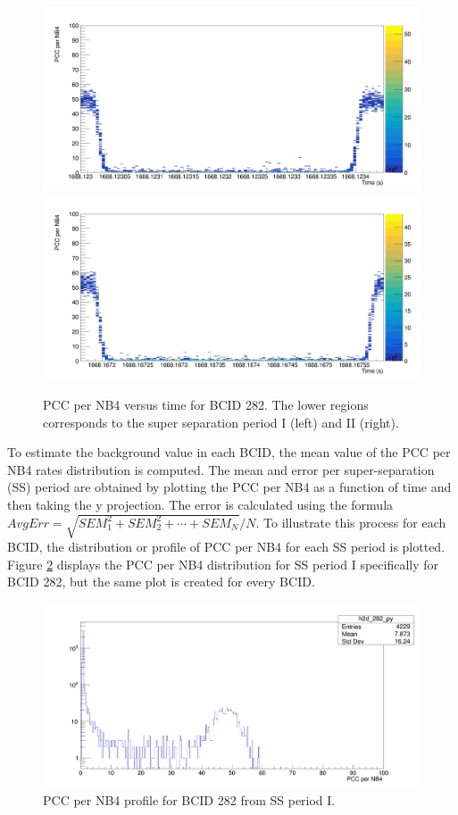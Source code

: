 \begin{center}
\begin{figure}[h!]
\centering
\includegraphics[width=.49\textwidth]{Chapter4/BX_282_Rates_SS1.png}
\includegraphics[width=.49\textwidth]{Chapter4/BX_282_Rates_SS2.png}
\caption[Super Separation periods for BCID 282]{PCC per NB4 versus time for BCID 282. The lower regions corresponds to the super separation period I (left) and II (right).}
\label{ssp_wide_bx282}
\end{figure}
\end{center}

To estimate the background value in each BCID, the mean value of the PCC per NB4 rates distribution is computed. The mean and error per super-separation (SS) period are obtained by plotting the PCC per NB4 as a function of time and then taking the y projection. The error is calculated using the formula $AvgErr = \sqrt{SEM_1^2 + SEM_2^2 + \cdots + SEM_N}/N$. To illustrate this process for each BCID, the distribution or profile of PCC per NB4 for each SS period is plotted. Figure \ref{ss1_hist_282} displays the PCC per NB4 distribution for SS period I specifically for BCID 282, but the same plot is created for every BCID.\\

\begin{center}
  \begin{figure}[h!]
    \centering
    \includegraphics[scale=.18]{Chapter4/ss1_histo_bx282.png}
    \caption[PCC per NB4 profile for BCID 282 from SS period I]{ PCC per NB4 profile for BCID 282 from SS period I.} 
    \label{ss1_hist_282}
  \end{figure}
\end{center}


